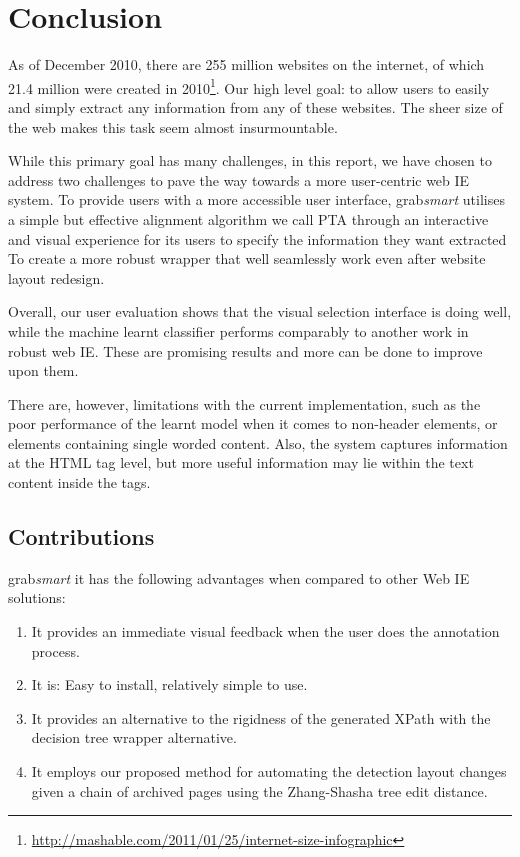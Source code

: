  \chapter{Conclusion}
As of December 2010, there are 255 million websites on the internet, of which 21.4 million
were created in 2010\footnote{\url{http://mashable.com/2011/01/25/internet-size-infographic}}.
Our high level goal: to allow users to easily and simply extract any information from any 
of these websites. The sheer size of the web makes this task seem almost insurmountable.

While this primary goal has many challenges, in this report, we have chosen to address 
two challenges to pave the way towards a more user-centric web IE system. To provide users with a more accessible
user interface, grab\textit{smart} utilises a simple but effective alignment algorithm we call
PTA through an interactive and visual experience for its users to specify the information they want extracted
To create a more robust wrapper that well seamlessly work even after website layout redesign.

Overall, our user evaluation shows that the visual selection interface is doing well, 
while the machine learnt classifier performs comparably to another work in robust 
web IE. These are promising results and more can be done to improve upon them.

There are, however, limitations with the current implementation, such as the poor performance of
the learnt model when it comes to non-header elements, or elements containing single worded
content. Also, the system captures information at the HTML tag level, but more useful information
may lie within the text content inside the tags.

\section{Contributions}
grab\textit{smart} it has the following advantages when compared to other Web IE solutions:
\begin{enumerate}
	\item It provides an immediate visual feedback when the user does the annotation process.
	\item It is: Easy to install, relatively simple to use.
	\item It provides an alternative to the rigidness of the generated XPath with the decision
	tree wrapper alternative.
	\item It employs our proposed method for automating the detection layout changes given
	a chain of archived pages using the Zhang-Shasha tree edit distance.
\end{enumerate}

